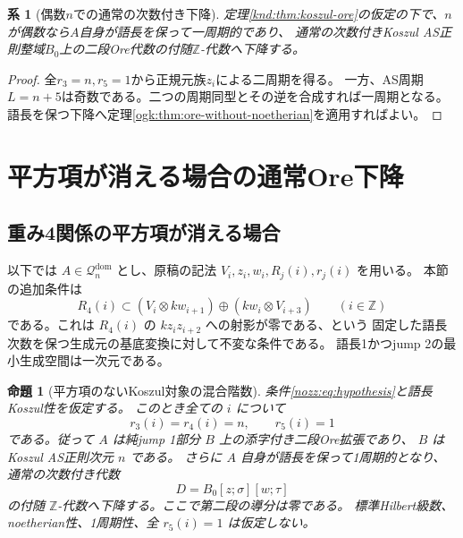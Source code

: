 \documentclass[11pt,a4paper]{ltjsarticle}
\newtheorem{proposition}[theorem]{命題}
\newtheorem{corollary}[theorem]{系}
\theoremstyle{definition}
\begin{document}
\begin{corollary}[偶数$n$での通常の次数付き下降]
\label{knd:cor:even-descent}
定理\ref{knd:thm:koszul-ore}の仮定の下で、$n$が偶数なら$A$自身が語長を保って一周期的であり、
通常の次数付きKoszul AS正則整域$B_0$上の二段Ore代数の付随$\mathbb Z$-代数へ下降する。
\end{corollary}
\begin{proof}
全$r_3=n,r_5=1$から正規元族$z_i$による二周期を得る。
一方、AS周期$L=n+5$は奇数である。二つの周期同型とその逆を合成すれば一周期となる。
語長を保つ下降へ定理\ref{ogk:thm:ore-without-noetherian}を適用すればよい。
\end{proof}


\section{平方項が消える場合の通常Ore下降}\label{sec:nozz}
\subsection{重み4関係の平方項が消える場合}

以下では $A\in\mathcal Q_n^{\mathrm{dom}}$ とし、原稿の記法
$V_i,z_i,w_i,R_j(i),r_j(i)$ を用いる。
本節の追加条件は
\begin{equation}\label{nozz:eq:hypothesis}
 R_4(i)\subset
 (V_i\otimes kw_{i+1})\oplus(kw_i\otimes V_{i+3})
 \qquad(i\in\mathbb Z)
\end{equation}
である。これは $R_4(i)$ の $kz_iz_{i+2}$ への射影が零である、という
固定した語長次数を保つ生成元の基底変換に対して不変な条件である。
語長1かつjump 2の最小生成空間は一次元である。

\begin{proposition}[平方項のないKoszul対象の混合階数]
\label{nozz:prop:koszul-saturation}
条件\eqref{nozz:eq:hypothesis}と語長Koszul性を仮定する。
このとき全ての $i$ について
\[
 r_3(i)=r_4(i)=n,\qquad r_5(i)=1
\]
である。従って $A$ は純jump 1部分 $B$ 上の添字付き二段Ore拡張であり、
$B$ はKoszul AS正則次元 $n$ である。
さらに $A$ 自身が語長を保って1周期的となり、通常の次数付き代数
\[
 D=B_0[z;\sigma][w;\tau]
\]
の付随 $\mathbb Z$-代数へ下降する。ここで第二段の導分は零である。
標準Hilbert級数、noetherian性、1周期性、全 $r_5(i)=1$ は仮定しない。
\end{proposition}
\end{document}
